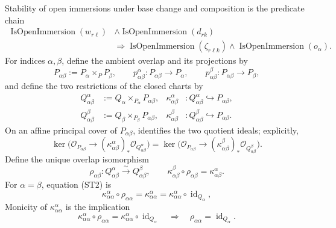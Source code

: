 \begin{definition}
\[  \]
  Stability of open immersions under base change and composition is the
  predicate chain
  \[
  \begin{aligned}
    \operatorname{IsOpenImmersion}(w_{r\ell})
      &\wedge\operatorname{IsOpenImmersion}(d_{rk})\\
      &\Longrightarrow
        \operatorname{IsOpenImmersion}(\zeta_{r\ell k})
        \wedge\operatorname{IsOpenImmersion}(o_\alpha).
  \end{aligned}
  \]
  For indices $\alpha,\beta$, define the ambient overlap and its projections
  by
  \[
    P_{\alpha\beta}:=P_\alpha\times_PP_\beta,\qquad
    p^\alpha_{\alpha\beta}\colon P_{\alpha\beta}\to P_\alpha,\qquad
    p^\beta_{\alpha\beta}\colon P_{\alpha\beta}\to P_\beta,
  \]
  and define the two restrictions of the closed charts by
  \[
  \begin{aligned}
    Q_{\alpha\beta}^{\alpha}
      &:=Q_\alpha\times_{P_\alpha}P_{\alpha\beta},&
    \kappa_{\alpha\beta}^{\alpha}
      &\colon Q_{\alpha\beta}^{\alpha}\hookrightarrow P_{\alpha\beta},\\
    Q_{\alpha\beta}^{\beta}
      &:=Q_\beta\times_{P_\beta}P_{\alpha\beta},&
    \kappa_{\alpha\beta}^{\beta}
      &\colon Q_{\alpha\beta}^{\beta}\hookrightarrow P_{\alpha\beta}.
  \end{aligned}
  \]
  On an affine principal cover of $P_{\alpha\beta}$,
   identifies the two
  quotient ideals; explicitly,
  \[
    \ker\bigl(\mathcal O_{P_{\alpha\beta}}\to
      (\kappa_{\alpha\beta}^{\alpha})_*
        \mathcal O_{Q_{\alpha\beta}^{\alpha}}\bigr)
    =
    \ker\bigl(\mathcal O_{P_{\alpha\beta}}\to
      (\kappa_{\alpha\beta}^{\beta})_*
        \mathcal O_{Q_{\alpha\beta}^{\beta}}\bigr).               \tag{ST1}
  \]
  Define the unique overlap isomorphism
  \[
    \rho_{\alpha\beta}\colon
      Q_{\alpha\beta}^{\alpha}\xrightarrow{\sim}
      Q_{\alpha\beta}^{\beta},
    \qquad
    \kappa_{\alpha\beta}^{\beta}\circ\rho_{\alpha\beta}
      =\kappa_{\alpha\beta}^{\alpha}.                            \tag{ST2}
  \]
  For $\alpha=\beta$, equation (ST2) is
  \[
    \kappa_{\alpha\alpha}^{\alpha}\circ\rho_{\alpha\alpha}
      =\kappa_{\alpha\alpha}^{\alpha}
      =\kappa_{\alpha\alpha}^{\alpha}\circ
        \operatorname{id}_{Q_\alpha},
  \]
  Monicity of $\kappa_{\alpha\alpha}^{\alpha}$ is the implication
  \[
    \kappa_{\alpha\alpha}^{\alpha}\circ\rho_{\alpha\alpha}
      =\kappa_{\alpha\alpha}^{\alpha}\circ
        \operatorname{id}_{Q_\alpha}
    \quad\Longrightarrow\quad
    \rho_{\alpha\alpha}=\operatorname{id}_{Q_\alpha}.
\]
\end{definition}
